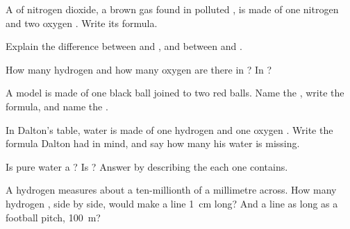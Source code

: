 \begin{exercise}[$\star$]\label{exo:g7:atoms-and-molecules:5}
A  of nitrogen dioxide, a brown gas found in polluted , is
made of one nitrogen  and two oxygen . Write its formula.
\end{exercise}

\begin{exercise}[$\star\star$]\label{exo:g7:atoms-and-molecules:6}
Explain the difference between  and , and between 
and .
\end{exercise}

\begin{exercise}[$\star\star$]\label{exo:g7:atoms-and-molecules:7}
How many hydrogen  and how many oxygen  are there in
? In ?
\end{exercise}

\begin{exercise}[$\star\star$]\label{exo:g7:atoms-and-molecules:8}
A model is made of one black ball joined to two red balls. Name the
, write the formula, and name the .
\end{exercise}

\begin{exercise}[$\star\star$]\label{exo:g7:atoms-and-molecules:9}
In Dalton's table, water is made of one hydrogen  and one oxygen
. Write the formula Dalton had in mind, and say how many  his
water  is missing.
\end{exercise}

\begin{exercise}[$\star\star$]\label{exo:g7:atoms-and-molecules:10}
Is pure water a ? Is ? Answer by describing the  each
one contains.
\end{exercise}

\begin{exercise}[$\star\star\star$]\label{exo:g7:atoms-and-molecules:11}
A hydrogen  measures about a ten-millionth of a millimetre across.
How many hydrogen , side by side, would make a line \qty{1}{cm}
long? And a line as long as a football pitch, \qty{100}{m}?
\end{exercise}

